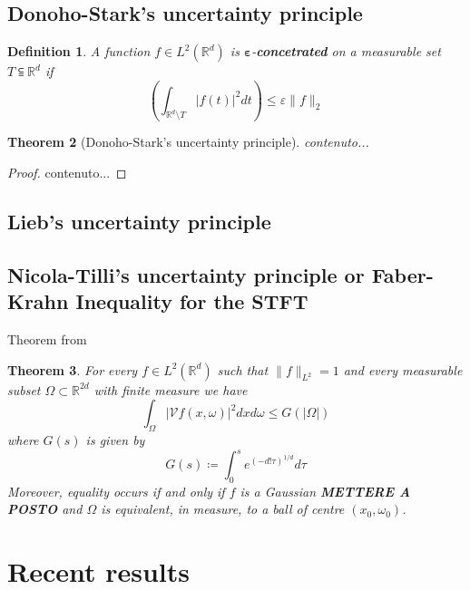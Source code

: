 \documentclass[corpo=11pt, stile=classica, tipotesi=custom,
greek, evenboxes, english]{toptesi}
\numberwithin{equation}{chapter}
\newtheorem{teo}{Theorem}[chapter] %
\newtheorem{defi}[teo]{Definition}
\newcommand{\R}{\mathbb{R}} %
\newcommand{\V}{\mathcal{V}} %
\newcommand{\dxdo}{dxd\omega}
\begin{document}
\section{Donoho-Stark's uncertainty principle}\label{section Donoho-Stark's UP}
\begin{defi}\label{epsilon-concetrated def}
	A function $f \in L^2(\R^d)$ is $\mathbf{\varepsilon}$-\textbf{concetrated} on a measurable set $T \subseteqq \R^d$ if
	\begin{equation*}
		\left(\int_{\R^d \setminus T} |f(t)|^2 dt \right) \leq \varepsilon \| f \|_2
	\end{equation*}
\end{defi}
\begin{teo}[Donoho-Stark's uncertainty principle]
	contenuto...
\end{teo}
\begin{proof}
	contenuto...
\end{proof}
\section{Lieb's uncertainty principle}\label{section Lieb's UP}
\section{Nicola-Tilli's uncertainty principle or Faber-Krahn Inequality for the STFT}\label{section Faber-Krahn inequality fot STFT}
Theorem from \cite{nicolatilli_fk}
\begin{teo}\label{faberkrahn theorem}
	For every $f \in L^2(\R^d)$ such that $\|f\|_{L^2} = 1$ and every measurable subset $\Omega \subset \R^{2d}$ with finite measure we have
	\begin{equation*}
		\int_{\Omega}  |\V f(x,\omega)|^2 \dxdo \leq G(|\Omega|)
	\end{equation*}
	where $G(s)$ is given by
	\begin{equation}\label{G}
		G(s) \coloneqq \int_0^s e^{\left(-d!\tau\right)^{1/d}} d\tau
	\end{equation}
	Moreover, equality occurs if and only if $f$ is a Gaussian \textbf{METTERE A POSTO} and $\Omega$ is equivalent, in measure, to a ball of centre $(x_0,\omega_0)$.
\end{teo}

\chapter{Recent results}\label{chapter recent results}
\end{document}
